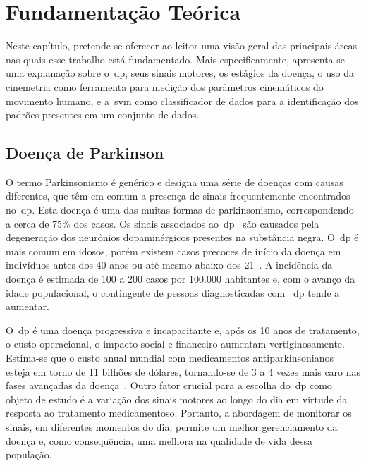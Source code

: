 \chapter{Fundamentação Teórica}\label{chapter:fundamentacao}
Neste capítulo, pretende-se oferecer ao leitor uma visão geral das principais áreas nas quais esse trabalho está fundamentado. Mais especificamente, apresenta-se uma explanação sobre o~\ac{dp}, seus sinais motores, os estágios da doença, o uso da cinemetria como ferramenta para medição dos parâmetros cinemáticos do movimento humano, e a~\ac{svm} como classificador de dados para a identificação dos padrões presentes em um conjunto de dados.


\section{Doença de Parkinson}\label{section:doenca_parkinson}
O termo Parkinsonismo é genérico e designa uma série de doenças com causas diferentes, que têm em comum a presença de sinais frequentemente encontrados no~\ac{dp}. Esta doença é uma das muitas formas de parkinsonismo, correspondendo a cerca de 75$\%$ dos casos. Os sinais associados ao~\ac{dp}~\cite{protpar010} são causados pela degeneração dos neurônios dopaminérgicos presentes na substância negra. O~\ac{dp} é mais comum em idosos, porém existem casos precoces de início da doença em indivíduos antes dos 40 anos ou até mesmo abaixo dos 21~\cite{menezes2003}. A incidência da doença é estimada de 100 a 200 casos por 100.000 habitantes e, com o avanço da idade populacional, o contingente de pessoas diagnosticadas com ~\ac{dp} tende a aumentar.

O~\ac{dp} é uma doença progressiva e incapacitante e, após os 10 anos de tratamento, o custo operacional, o impacto social e financeiro aumentam vertiginosamente. Estima-se que o custo anual mundial com medicamentos antiparkinsonianos esteja em torno de 11 bilhões de dólares, tornando-se de 3 a 4 vezes mais caro nas fases avançadas da doença~\cite{protpar010}. Outro fator crucial para a escolha do~\ac{dp} como objeto de estudo é a variação dos sinais motores ao longo do dia em virtude da resposta ao tratamento medicamentoso. Portanto, a abordagem de monitorar os sinais, em diferentes momentos do dia, permite um melhor gerenciamento da doença e, como consequência, uma melhora na qualidade de vida dessa população.


